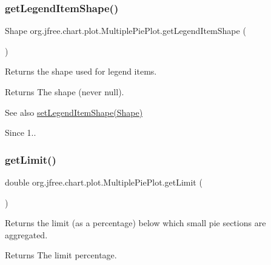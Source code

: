 \subsubsection{\texorpdfstring{get\+Legend\+Item\+Shape()}{getLegendItemShape()}}
{\footnotesize\ttfamily Shape org.\+jfree.\+chart.\+plot.\+Multiple\+Pie\+Plot.\+get\+Legend\+Item\+Shape (\begin{DoxyParamCaption}{ }\end{DoxyParamCaption})}

Returns the shape used for legend items.

\begin{DoxyReturn}{Returns}
The shape (never {\ttfamily null}).
\end{DoxyReturn}
\begin{DoxySeeAlso}{See also}
\mbox{\hyperlink{classorg_1_1jfree_1_1chart_1_1plot_1_1_multiple_pie_plot_ab20492349d20cde1d15d70b665b1a57d}{set\+Legend\+Item\+Shape(\+Shape)}}
\end{DoxySeeAlso}
\begin{DoxySince}{Since}
1.. 
\end{DoxySince}
\mbox{\label{classorg_1_1jfree_1_1chart_1_1plot_1_1_multiple_pie_plot_aa3776a88da5002af69ec36a68633c770}} 
\subsubsection{\texorpdfstring{get\+Limit()}{getLimit()}}
{\footnotesize\ttfamily double org.\+jfree.\+chart.\+plot.\+Multiple\+Pie\+Plot.\+get\+Limit (\begin{DoxyParamCaption}{ }\end{DoxyParamCaption})}

Returns the limit (as a percentage) below which small pie sections are aggregated.

\begin{DoxyReturn}{Returns}
The limit percentage. 
\end{DoxyReturn}
\mbox{\label{classorg_1_1jfree_1_1chart_1_1plot_1_1_multiple_pie_plot_ab8664cb990f572f73346eba4053741b0}} 

